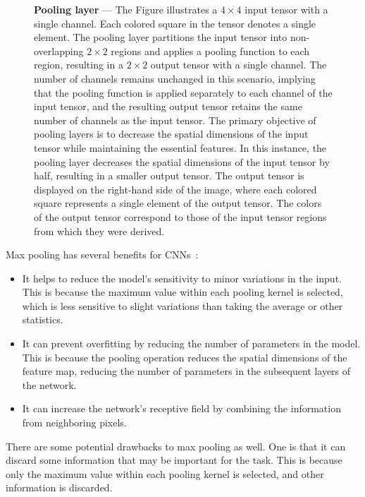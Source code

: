 \begin{figure}[ht]
    \centering
    \caption[Pooling layer]{\textbf{Pooling layer} --- The Figure illustrates a $4 \times 4$ input tensor with a single channel. Each colored square in the tensor denotes a single element. The pooling layer partitions the input tensor into non-overlapping $2 \times 2$ regions and applies a pooling function to each region, resulting in a $2 \times 2$ output tensor with a single channel. The number of channels remains unchanged in this scenario, implying that the pooling function is applied separately to each channel of the input tensor, and the resulting output tensor retains the same number of channels as the input tensor. The primary objective of pooling layers is to decrease the spatial dimensions of the input tensor while maintaining the essential features. In this instance, the pooling layer decreases the spatial dimensions of the input tensor by half, resulting in a smaller output tensor. The output tensor is displayed on the right-hand side of the image, where each colored square represents a single element of the output tensor. The colors of the output tensor correspond to those of the input tensor regions from which they were derived.}
    \label{fig:pool}
\end{figure}

Max pooling has several benefits for \acp{CNN}~\cite{riesenhuber_hierarchical_1999}:
\begin{itemize}
    \item It helps to reduce the model's sensitivity to minor variations in the input. This is because the maximum value within each pooling kernel is selected, which is less sensitive to slight variations than taking the average or other statistics.
    \item It can prevent overfitting by reducing the number of parameters in the model. This is because the pooling operation reduces the spatial dimensions of the feature map, reducing the number of parameters in the subsequent layers of the network.
    \item It can increase the network's receptive field by combining the information from neighboring pixels.
\end{itemize}

There are some potential drawbacks to max pooling as well. One is that it can discard some information that may be important for the task. This is because only the maximum value within each pooling kernel is selected, and other information is discarded.

